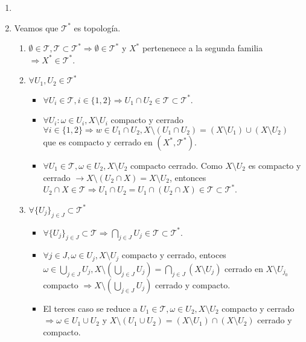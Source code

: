 \begin{dem}
  \begin{enumerate}[label=(\roman*)]
    \item []
    \item Veamos que $\mathcal{T}^*$ es topología.
      \begin{enumerate}
      \item $\emptyset \in \mathcal{T}, \mathcal{T} \subset \mathcal{T}^* \Rightarrow \emptyset \in \mathcal{T}^*$ y $X^*$ pertenenece a la segunda familia $\Rightarrow X^* \in \mathcal{T}^*$.
      \item $\forall U_{1}, U_{2} \in \mathcal{T}^*$
        \begin{itemize}
          \item $\forall U_{i} \in \mathcal{T}, i \in \{ 1, 2 \} \Rightarrow U_{1} \cap U_{2} \in \mathcal{T} \subset \mathcal{T}^*$.
          \item $\forall U_{i} : \omega \in U_{i}, X \setminus U_{i}$ compacto y cerrado $\forall i \in \{  1, 2 \} \Rightarrow w \in U_{1} \cap U_{2}, X \setminus (U_{1} \cap U_{2}) = (X \setminus U_{1}) \cup (X \setminus U_{2})$ que es compacto y cerrado en $( X^*, \mathcal{T}^* )$.
          \item $\forall U_{1} \in \mathcal{T}, \omega \in U_{2}, X \setminus U_{2}$ compacto cerrado. Como $X \setminus U_{2}$ es compacto y cerrado $\rightarrow X \setminus (U_{2} \cap X) = X \setminus U_{2}$, entonces $U_{2} \cap X \in \mathcal{T} \Rightarrow U_{1} \cap U_{2} = U_{1} \cap (U_{2} \cap X) \in \mathcal{T} \subset \mathcal{T}^*$.
        \end{itemize}
      \item $\forall \{ U_{j} \}_{j \in J} \subset \mathcal{T}^*$
        \begin{itemize}
          \item $\forall \{ U_{j} \}_{j \in J} \subset \mathcal{T} \Rightarrow \bigcap_{j \in J} U_{j} \in \mathcal{T} \subset \mathcal{T}^*$.
          \item $\forall j \in J, \omega \in U_{j}, X \setminus U_{j}$ compacto y cerrado, entoces $\omega \in \bigcup_{j \in J} U_{j}, X \setminus (\bigcup_{j \in J} U_{j}) = \bigcap_{j \in J} (X \setminus U_{j})$ cerrado en $X \setminus U_{j_{0}}$ compacto $\Rightarrow X \setminus (\bigcup_{j \in J} U_{j})$ cerrado y compacto.
          \item El terces caso se reduce a $U_{1} \in \mathcal{T}, \omega \in U_{2}, X \setminus U_{2}$ compacto y cerrado $\Rightarrow \omega \in U_{1} \cup U_{2}$ y $X \setminus (U_{1} \cup U_{2}) = (X \setminus U_{1}) \cap (X \setminus U_{2})$ cerrado y compacto.

\end{itemize}
\end{enumerate}
\end{enumerate}
\end{dem}
